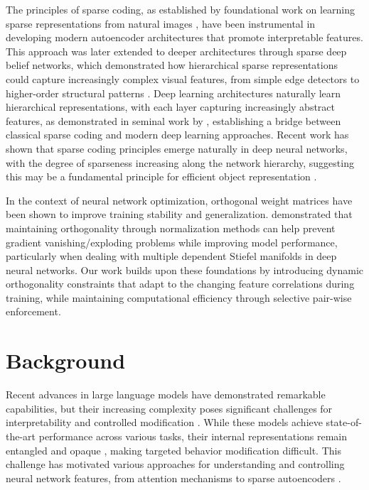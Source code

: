 \documentclass{article} %
\begin{document}
The principles of sparse coding, as established by foundational work on learning sparse representations from natural images \cite{Olshausen1996EmergenceOS}, have been instrumental in developing modern autoencoder architectures that promote interpretable features. This approach was later extended to deeper architectures through sparse deep belief networks, which demonstrated how hierarchical sparse representations could capture increasingly complex visual features, from simple edge detectors to higher-order structural patterns \cite{Lee2007SparseDB}. Deep learning architectures naturally learn hierarchical representations, with each layer capturing increasingly abstract features, as demonstrated in seminal work by \cite{Bengio2007LearningDA}, establishing a bridge between classical sparse coding and modern deep learning approaches. Recent work has shown that sparse coding principles emerge naturally in deep neural networks, with the degree of sparseness increasing along the network hierarchy, suggesting this may be a fundamental principle for efficient object representation \cite{Liu2020HierarchicalSC}.

In the context of neural network optimization, orthogonal weight matrices have been shown to improve training stability and generalization. \cite{Huang2017OrthogonalWN} demonstrated that maintaining orthogonality through normalization methods can help prevent gradient vanishing/exploding problems while improving model performance, particularly when dealing with multiple dependent Stiefel manifolds in deep neural networks. Our work builds upon these foundations by introducing dynamic orthogonality constraints that adapt to the changing feature correlations during training, while maintaining computational efficiency through selective pair-wise enforcement.

\section{Background}
\label{sec:background}

Recent advances in large language models have demonstrated remarkable capabilities, but their increasing complexity poses significant challenges for interpretability and controlled modification \cite{vaswani2017attention}. While these models achieve state-of-the-art performance across various tasks, their internal representations remain entangled and opaque \cite{goodfellow2016deep}, making targeted behavior modification difficult. This challenge has motivated various approaches for understanding and controlling neural network features, from attention mechanisms to sparse autoencoders \cite{bahdanau2014neural}.
\end{document}
